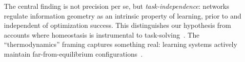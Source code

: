 The central finding is not precision per se, but \emph{task-independence}: networks regulate information geometry as an intrinsic property of learning, prior to and independent of optimization success. This distinguishes our hypothesis from accounts where homeostasis is instrumental to task-solving~\cite{tishby2015deep}. The ``thermodynamics'' framing captures something real: learning systems actively maintain far-from-equilibrium configurations~\cite{friston2010free, kringelbach2024thermodynamics}.

